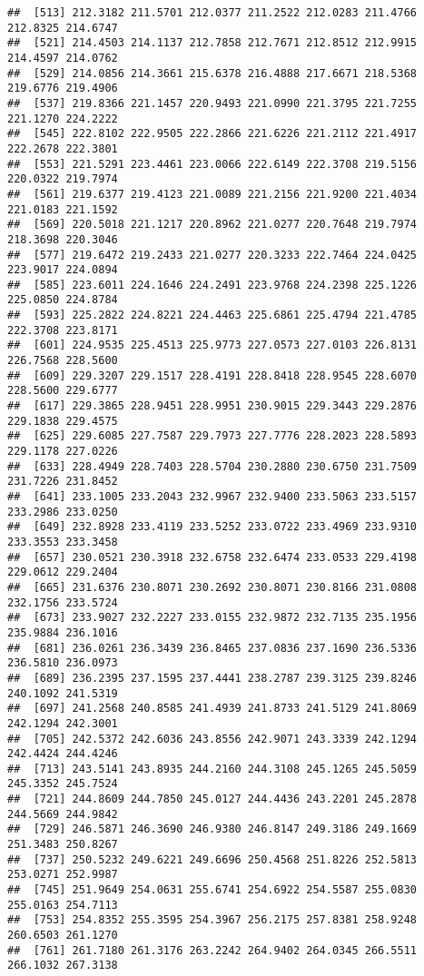\documentclass[
]{article}
\begin{document}
\begin{verbatim}
##  [513] 212.3182 211.5701 212.0377 211.2522 212.0283 211.4766 212.8325 214.6747
##  [521] 214.4503 214.1137 212.7858 212.7671 212.8512 212.9915 214.4597 214.0762
##  [529] 214.0856 214.3661 215.6378 216.4888 217.6671 218.5368 219.6776 219.4906
##  [537] 219.8366 221.1457 220.9493 221.0990 221.3795 221.7255 221.1270 224.2222
##  [545] 222.8102 222.9505 222.2866 221.6226 221.2112 221.4917 222.2678 222.3801
##  [553] 221.5291 223.4461 223.0066 222.6149 222.3708 219.5156 220.0322 219.7974
##  [561] 219.6377 219.4123 221.0089 221.2156 221.9200 221.4034 221.0183 221.1592
##  [569] 220.5018 221.1217 220.8962 221.0277 220.7648 219.7974 218.3698 220.3046
##  [577] 219.6472 219.2433 221.0277 220.3233 222.7464 224.0425 223.9017 224.0894
##  [585] 223.6011 224.1646 224.2491 223.9768 224.2398 225.1226 225.0850 224.8784
##  [593] 225.2822 224.8221 224.4463 225.6861 225.4794 221.4785 222.3708 223.8171
##  [601] 224.9535 225.4513 225.9773 227.0573 227.0103 226.8131 226.7568 228.5600
##  [609] 229.3207 229.1517 228.4191 228.8418 228.9545 228.6070 228.5600 229.6777
##  [617] 229.3865 228.9451 228.9951 230.9015 229.3443 229.2876 229.1838 229.4575
##  [625] 229.6085 227.7587 229.7973 227.7776 228.2023 228.5893 229.1178 227.0226
##  [633] 228.4949 228.7403 228.5704 230.2880 230.6750 231.7509 231.7226 231.8452
##  [641] 233.1005 233.2043 232.9967 232.9400 233.5063 233.5157 233.2986 233.0250
##  [649] 232.8928 233.4119 233.5252 233.0722 233.4969 233.9310 233.3553 233.3458
##  [657] 230.0521 230.3918 232.6758 232.6474 233.0533 229.4198 229.0612 229.2404
##  [665] 231.6376 230.8071 230.2692 230.8071 230.8166 231.0808 232.1756 233.5724
##  [673] 233.9027 232.2227 233.0155 232.9872 232.7135 235.1956 235.9884 236.1016
##  [681] 236.0261 236.3439 236.8465 237.0836 237.1690 236.5336 236.5810 236.0973
##  [689] 236.2395 237.1595 237.4441 238.2787 239.3125 239.8246 240.1092 241.5319
##  [697] 241.2568 240.8585 241.4939 241.8733 241.5129 241.8069 242.1294 242.3001
##  [705] 242.5372 242.6036 243.8556 242.9071 243.3339 242.1294 242.4424 244.4246
##  [713] 243.5141 243.8935 244.2160 244.3108 245.1265 245.5059 245.3352 245.7524
##  [721] 244.8609 244.7850 245.0127 244.4436 243.2201 245.2878 244.5669 244.9842
##  [729] 246.5871 246.3690 246.9380 246.8147 249.3186 249.1669 251.3483 250.8267
##  [737] 250.5232 249.6221 249.6696 250.4568 251.8226 252.5813 253.0271 252.9987
##  [745] 251.9649 254.0631 255.6741 254.6922 254.5587 255.0830 255.0163 254.7113
##  [753] 254.8352 255.3595 254.3967 256.2175 257.8381 258.9248 260.6503 261.1270
##  [761] 261.7180 261.3176 263.2242 264.9402 264.0345 266.5511 266.1032 267.3138

\end{verbatim}
\end{document}
